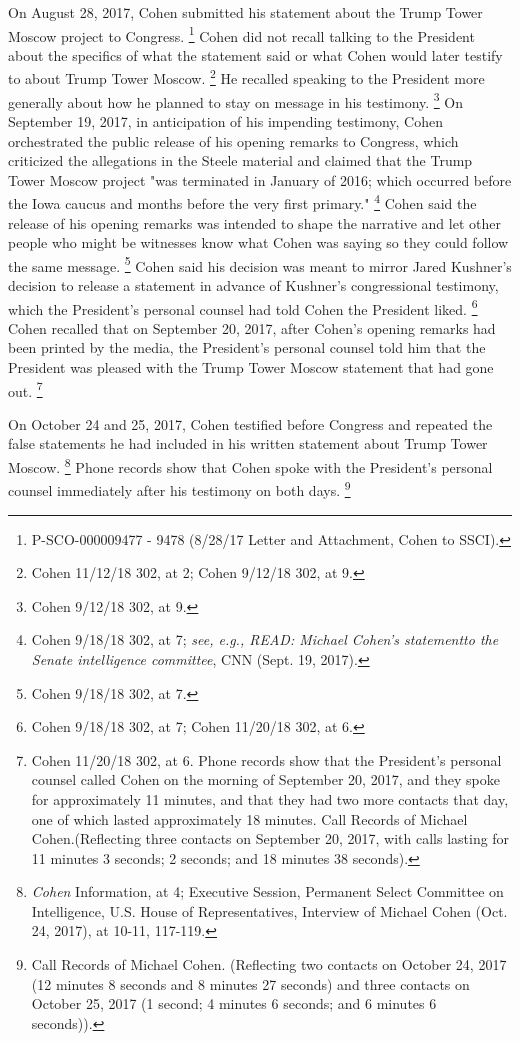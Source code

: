 {On August 28, 2017, Cohen submitted his statement about the Trump Tower Moscow project to Congress.%
\footnote{P-SCO-000009477 - 9478 (8/28/17 Letter and Attachment, Cohen to SSCI).}
Cohen did not recall talking to the President about the specifics of what the statement said or what Cohen would later testify to about Trump Tower Moscow.%
\footnote{Cohen 11/12/18 302, at 2;
Cohen 9/12/18 302, at 9.}
He recalled speaking to the President more generally about how he planned to stay on message in his testimony.%
\footnote{Cohen 9/12/18 302, at 9.}
On September 19, 2017, in anticipation of his impending testimony, Cohen orchestrated the public release of his opening remarks to Congress, which criticized the allegations in the Steele material and claimed that the Trump Tower Moscow project "was terminated in January of 2016; which occurred before the Iowa caucus and months before the very first primary."%
\footnote{Cohen 9/18/18 302, at 7;
\textit{see, e.g., READ: Michael Cohen’s statementto the Senate intelligence committee}, CNN (Sept. 19, 2017).}
Cohen said the release of his opening remarks was intended to shape the narrative and let other people who might be witnesses know what Cohen was saying so they could follow the same message.%
\footnote{Cohen 9/18/18 302, at 7.}
Cohen said his decision was meant to mirror Jared Kushner's decision to release a statement in advance of Kushner's congressional testimony, which the President's personal counsel had told Cohen the President liked.%
\footnote{Cohen 9/18/18 302, at 7;
Cohen 11/20/18 302, at 6.}
Cohen recalled that on September 20, 2017, after Cohen's opening remarks had been printed by the media, the President's personal counsel told him that the President was pleased with the Trump Tower Moscow statement that had gone out.%
\footnote{Cohen 11/20/18 302, at 6.
Phone records show that the President’s personal counsel called Cohen on the morning of September 20, 2017, and they spoke for approximately 11 minutes, and that they had two more contacts that day, one of which lasted approximately 18 minutes.
Call Records of Michael Cohen.(Reflecting three contacts on September 20, 2017, with calls lasting for 11 minutes 3 seconds; 2 seconds; and 18 minutes 38 seconds).}

On October 24 and 25, 2017, Cohen testified before Congress and repeated the false statements he had included in his written statement about Trump Tower Moscow.%
\footnote{\textit{Cohen} Information, at 4;
Executive Session, Permanent Select Committee on Intelligence, U.S. House of Representatives, Interview of Michael Cohen (Oct. 24, 2017), at 10-11, 117-119.}
Phone records show that Cohen spoke with the President's personal counsel immediately after his testimony on both days.%
\footnote{Call Records of Michael Cohen.
(Reflecting two contacts on October 24, 2017 (12 minutes 8 seconds and 8 minutes 27 seconds) and three contacts on October 25, 2017 (1 second; 4 minutes 6 seconds; and 6 minutes 6 seconds)).}

}
